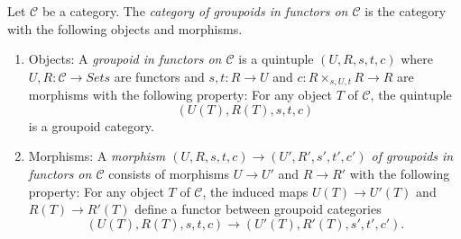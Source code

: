 \begin{definition}
\label{definition-groupoid-in-functors}
Let $\mathcal{C}$ be a category. The
{\it category of groupoids in functors on $\mathcal{C}$}
is the category with the following objects and morphisms.
\begin{enumerate}
\item Objects: A {\it groupoid in functors on $\mathcal{C}$} is a quintuple
$(U, R, s, t, c)$ where $U, R : \mathcal{C} \to \textit{Sets}$ are
functors and $s, t : R \to U$ and $c : R \times_{s, U, t} R \to R$
are morphisms with the following property: For any object $T$ of $\mathcal{C}$,
the quintuple
$$
(U(T), R(T), s, t, c)
$$
is a groupoid category.
\item Morphisms: A {\it morphism $(U, R, s, t, c) \to (U', R', s', t', c')$ of
groupoids in functors on $\mathcal{C}$} consists of morphisms $U \to U'$
and $R \to R'$ with the following property: For any object $T$ of
$\mathcal{C}$, the induced maps $U(T) \to U'(T)$ and
$R(T) \to R'(T)$ define a functor between groupoid categories
$$
(U(T), R(T), s, t, c) \to (U'(T), R'(T), s', t', c').
$$
\end{enumerate}
\end{definition}